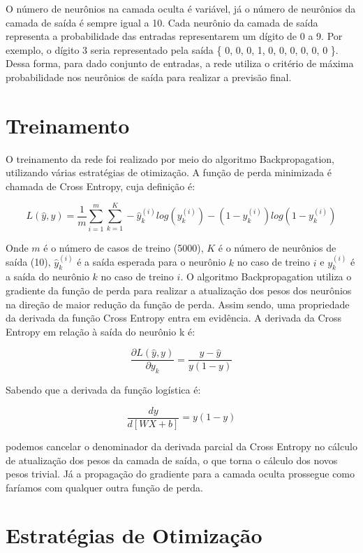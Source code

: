 \documentclass{report}
\begin{document}
O número de neurônios na camada oculta é variável, já o número de neurônios da camada de saída é sempre igual a 10.
Cada neurônio da camada de saída representa a probabilidade das entradas representarem um dígito de 0 a 9. Por exemplo,
o dígito 3 seria representado pela saída \{ 0, 0, 0, 1, 0, 0, 0, 0, 0, 0 \}. Dessa forma, para dado conjunto 
de entradas, a rede utiliza o critério de máxima probabilidade nos neurônios de saída para realizar a previsão final.

\section{Treinamento}

O treinamento da rede foi realizado por meio do algoritmo Backpropagation, utilizando várias estratégias de 
otimização. A função de perda minimizada é chamada de Cross Entropy, cuja definição é:

\[ L(\hat{y}, y) = \frac{1}{m} \sum_{i = 1}^{m} \sum_{k = 1}^{K} -\hat{y}_k^{(i)} log(y_k^{(i)}) -(1 - \hat{y}_k^{(i)}) log(1 - y_k^{(i)}) \]

Onde $ m $ é o número de casos de treino (5000), $ K $ é o número de neurônios de saída (10), $ \hat{y}_k^{(i)} $ é a saída
esperada para o neurônio $ k $ no caso de treino $ i $ e $ y_k^{(i)} $ é a saída do neurônio $ k $ no caso de treino $ i $.
O algoritmo Backpropagation utiliza o gradiente da função de perda para realizar a atualização dos pesos dos neurônios na
direção de maior redução da função de perda. Assim sendo, uma propriedade da derivada da função Cross Entropy entra
em evidência. A derivada da Cross Entropy em relação à saída do neurônio k é:

\[ \frac{\partial L(\hat{y}, y) }{\partial y_k} = \frac{y - \hat{y}}{y(1 - y)} \]

Sabendo que a derivada da função logística é:

\[ \frac{dy}{d[WX + b]} = y(1 - y) \]

podemos cancelar o denominador da derivada parcial da Cross Entropy no cálculo de atualização dos pesos da camada de saída, o que torna o cálculo 
dos novos pesos trivial. Já a propagação do gradiente para a camada oculta prossegue como faríamos com qualquer outra 
função de perda.

\section{Estratégias de Otimização}
\end{document}
